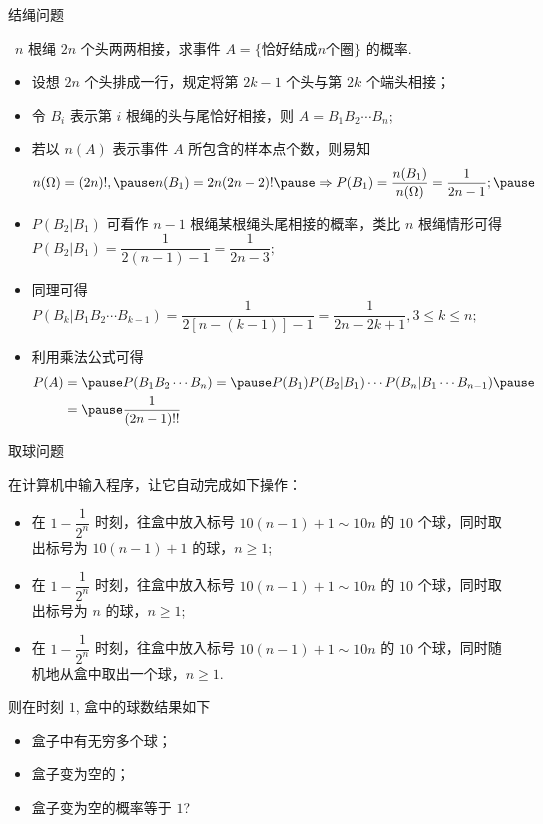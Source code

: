 \begin{frame}{结绳问题}
	\vspace{-0.15cm}
	\begin{exam}\
		$n$ 根绳 $2n$ 个头两两相接，求事件 $A=\{\mbox{恰好结成} n\mbox{个圈}\}$ 的概率.
	\end{exam}
	\pause
	\vspace{-0.4cm}
	\begin{itemize}[<+-|alert@+>]
		\item 设想 $2n$ 个头排成一行，规定将第 $2k-1$ 个头与第 $2k$ 个端头相接；
		\item 令 $B_i$ 表示第 $i$ 根绳的头与尾恰好相接，则 $A=B_1B_2\cdots B_n$;
		\item 若以 $n (A)$ 表示事件 $A$ 所包含的样本点个数，则易知 \pause
		\begin{eqnarray*}
			n(\Omega)=(2n)!, \pause n(B_1)=2n(2n-2)!\pause \Rightarrow P(B_1)=\dfrac{n(B_1)}{n(\Omega)}=\dfrac{1}{2n-1};\pause
		\end{eqnarray*}
		\item $P (B_2|B_1)$ 可看作 $n-1$ 根绳某根绳头尾相接的概率，类比 $n$ 根绳情形可得 $P (B_2|B_1)=\dfrac{1}{2 (n-1)-1}=\dfrac{1}{2n-3};$
		\item 同理可得 $P (B_k|B_1B_2\cdots B_{k-1})=\dfrac{1}{2[n-(k-1)]-1}=\dfrac{1}{2n-2k+1}, 3\leq k\leq n;$
		\item 利用乘法公式可得
		\begin{align*}
			P(A)&=\pause P(B_1B_2\cdots B_n)=\pause P(B_1)P(B_2|B_1)\cdots P(B_n|B_1\cdots B_{n-1})\pause\\
			&=\pause\dfrac{1}{(2n-1)!!}
		\end{align*}
	\end{itemize}


\end{frame}

\begin{frame}{取球问题}
	\begin{exam}
		在计算机中输入程序，让它自动完成如下操作：
		\begin{itemize}[<+-|alert@+>]
			\item 在 $1-\dfrac{1}{2^n}$ 时刻，往盒中放入标号 $10 (n-1)+1\sim 10n$ 的 $10$ 个球，同时取出标号为 $10 (n-1)+1$ 的球，$n\geq 1$;
			\item 在 $1-\dfrac{1}{2^n}$ 时刻，往盒中放入标号 $10 (n-1)+1\sim 10n$ 的 $10$ 个球，同时取出标号为 $n$ 的球，$n\geq 1$;
			\item 在 $1-\dfrac{1}{2^n}$ 时刻，往盒中放入标号 $10 (n-1)+1\sim 10n$ 的 $10$ 个球，同时随机地从盒中取出一个球，$n\geq 1$.
		\end{itemize}
	\pause
		则在时刻 $1$, 盒中的球数结果如下
		\begin{itemize}[<+-|alert@+>]
			\item 盒子中有无穷多个球；
			\item 盒子变为空的；
			\item 盒子变为空的概率等于 $1$?
		\end{itemize}
	\end{exam}
\end{frame}

